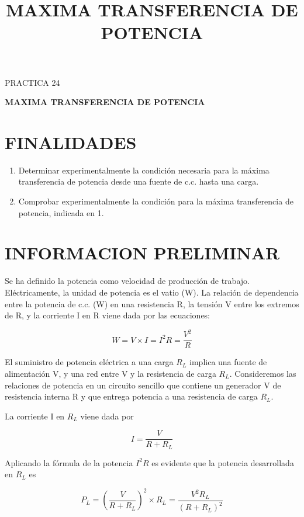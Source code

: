 \documentclass[12pt]{article}
\title{\textbf{MAXIMA TRANSFERENCIA DE POTENCIA}}
\author{}
\date{}
\begin{document}
\begin{center}
    \large
    PRACTICA 24
    \vspace{0.5cm}

    \huge
    \textbf{MAXIMA TRANSFERENCIA DE POTENCIA}
\end{center}

\section*{FINALIDADES}
\begin{enumerate}
    \item Determinar experimentalmente la condición necesaria para la máxima transferencia de potencia desde una fuente de c.c. hasta una carga.
    \item Comprobar experimentalmente la condición para la máxima transferencia de potencia, indicada en 1.
\end{enumerate}

\section*{INFORMACION PRELIMINAR}

Se ha definido la potencia como velocidad de producción de trabajo. Eléctricamente, la unidad de potencia es el vatio (W). La relación de dependencia entre la potencia de c.c. (W) en una resistencia R, la tensión V entre los extremos de R, y la corriente I en R viene dada por las ecuaciones:

\begin{equation}
W = V \times I = I^2 R = \frac{V^2}{R}
\end{equation}

El suministro de potencia eléctrica a una carga $R_L$ implica una fuente de alimentación V, y una red entre V y la resistencia de carga $R_L$. Consideremos las relaciones de potencia en un circuito sencillo que contiene un generador V de resistencia interna R y que entrega potencia a una resistencia de carga $R_L$.

La corriente I en $R_L$ viene dada por

\begin{equation}
I = \frac{V}{R + R_L}
\end{equation}

Aplicando la fórmula de la potencia $I^2 R$ es evidente que la potencia desarrollada en $R_L$ es

\begin{equation}
P_L = \left(\frac{V}{R + R_L}\right)^2 \times R_L = \frac{V^2 R_L}{(R + R_L)^2}
\end{equation}
\end{document}
